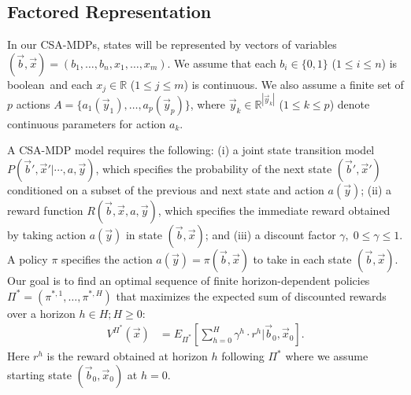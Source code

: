 \label{sec:csamdp}


\subsection{Factored Representation}

In our CSA-MDPs, states will be represented by vectors of variables
$(\vec{b},\vec{x}) = ( b_1,\ldots,b_n,x_{1},\ldots,x_m )$.  We assume
that each $b_i \in \{ 0,1 \}$ ($1 \leq i \leq n$) is boolean$\,$
and each $x_j \in \mathbb{R}$ ($1 \leq j \leq
m$) is continuous.  We also assume a finite set of $p$ actions $A = \{
a_1(\vec{y}_1), \ldots, a_p(\vec{y}_p) \}$, where 
$\vec{y}_k \in \mathbb{R}^{|\vec{y}_k|}$ ($1
\leq k \leq p$) denote continuous parameters for 
action $a_k$.

A CSA-MDP model requires the following: (i) a joint state transition model
$P(\vec{b}',\vec{x}'|\cdots,a,\vec{y})$, which specifies the
probability of the next state $(\vec{b}',\vec{x}')$ conditioned on a
subset of the previous and next state and action $a(\vec{y})$; (ii) a
reward function $R(\vec{b},\vec{x},a,\vec{y})$, which specifies the
immediate reward obtained by taking action $a(\vec{y})$ in state
$(\vec{b},\vec{x})$; and (iii) a discount factor $\gamma, \; 0 \leq
\gamma \leq 1$.
A policy $\pi$ specifies the action $a(\vec{y}) =
\pi(\vec{b},\vec{x})$ to take in each state $(\vec{b},\vec{x})$.  Our
goal is to find an optimal sequence of finite horizon-dependent
policies
$\Pi^* = (\pi^{*,1},\ldots,\pi^{*,H})$ that
maximizes the expected sum of discounted rewards over a horizon $h \in
H; H \geq 0$:
\begin{align}
V^{\Pi^*}(\vec{x}) & = E_{\Pi^*} \left[ \sum_{h=0}^{H} \gamma^h \cdot r^h \Big| \vec{b}_0,\vec{x}_0 \right]. \label{eq:vfun_def}
\end{align}
Here $r^h$ is the reward obtained at horizon $h$ following $\Pi^*$ where 
we assume starting state $(\vec{b}_0,\vec{x}_0)$ at $h=0$.
 

